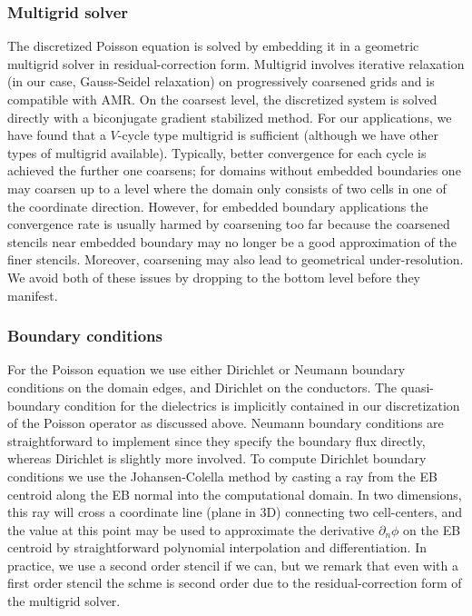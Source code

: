 \documentclass[3p]{elsarticle}
\begin{document}
\subsubsection{Multigrid solver}
The discretized Poisson equation is solved by embedding it in a geometric multigrid solver in residual-correction form. Multigrid involves iterative relaxation (in our case, Gauss-Seidel relaxation) on progressively coarsened grids and is compatible with AMR. On the coarsest level, the discretized system is solved directly with a biconjugate gradient stabilized method. For our applications, we have found that a $V$-cycle type multigrid is sufficient (although we have other types of multigrid available). Typically, better convergence for each cycle is achieved the further one coarsens; for domains without embedded boundaries one may coarsen up to a level where the domain only consists of two cells in one of the coordinate direction. However, for embedded boundary applications the convergence rate is usually harmed by coarsening too far because the coarsened stencils near embedded boundary may no longer be a good approximation of the finer stencils. Moreover, coarsening may also lead to geometrical under-resolution. We avoid both of these issues by dropping to the bottom level before they manifest. 

\subsubsection{Boundary conditions}
For the Poisson equation we use either Dirichlet or Neumann boundary conditions on the domain edges, and Dirichlet on the conductors. The quasi-boundary condition for the dielectrics is implicitly contained in our discretization of the Poisson operator as discussed above. Neumann boundary conditions are straightforward to implement since they specify the boundary flux directly, whereas Dirichlet is slightly more involved. To compute Dirichlet boundary conditions we use the Johansen-Colella method by casting a ray from the EB centroid along the EB normal into the computational domain. In two dimensions, this ray will cross a coordinate line (plane in 3D) connecting two cell-centers, and the value at this point may be used to approximate the derivative $\partial_n\phi$ on the EB centroid by straightforward polynomial interpolation and differentiation. In practice, we use a second order stencil if we can, but we remark that even with a first order stencil the schme is second order due to the residual-correction form of the multigrid solver. 
\end{document}
